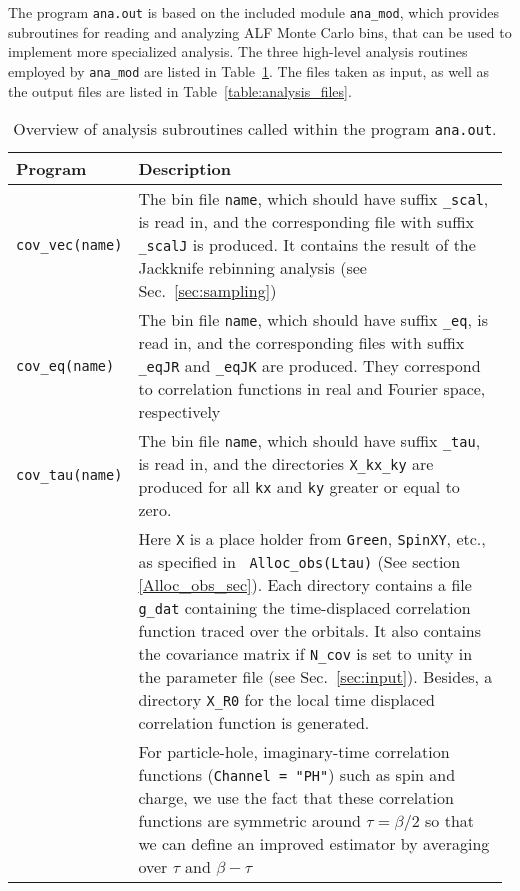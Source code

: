 The program \texttt{ana.out} is based on the included module \texttt{ana\_mod}, which provides subroutines for reading and analyzing ALF Monte Carlo bins, that can be used to implement more specialized analysis. The three high-level analysis routines employed by \texttt{ana\_mod} are listed in Table~\ref{table:analysis_programs}. The files taken as input, as well as the output files are listed in Table~\ref{table:analysis_files}.

\begin{table}[h]
	\begin{center}
	\begin{tabular}{@{} p{0.18\linewidth} @{$\;$} p{0.8\linewidth} @{}}\toprule
		Program & Description \\\midrule
		\texttt{cov\_vec(name)}  &  
		  The bin file \texttt{name}, which should have suffix \texttt{\_scal}, is read in, and  the corresponding file with suffix \texttt{\_scalJ} is produced. It contains the result of the Jackknife rebinning analysis (see Sec.~\ref{sec:sampling}) \\
		\texttt{cov\_eq(name)}    &  
		  The bin file \texttt{name}, which should have suffix \texttt{\_eq}, is read in, and the corresponding files with suffix \texttt{\_eqJR} and \texttt{\_eqJK} are produced. They  correspond to correlation functions in real and Fourier space, respectively \\
		\texttt{cov\_tau(name)}   &  
		  The bin file \texttt{name}, which should have suffix \texttt{\_tau}, is read in, and the directories \texttt{X\_kx\_ky} are produced for all \texttt{kx} and \texttt{ky} greater or equal to zero. \\
		& Here \texttt{X}  is a place holder from \texttt{Green}, \texttt{SpinXY}, etc., as specified in \texttt{ Alloc\_obs(Ltau)} (See section \ref{Alloc_obs_sec}). Each directory contains  a  file    \texttt{g\_dat}  containing the  time-displaced correlation function traced over the  orbitals.  It also contains the covariance matrix if \texttt{N\_cov} is set to unity in the parameter file (see Sec.~\ref{sec:input}). Besides, a directory \texttt{X\_R0} for the local time displaced correlation function is generated. \\
		& For particle-hole, imaginary-time correlation functions (\texttt{Channel = "PH"}) such as spin and charge, we use the fact that these correlation functions  are symmetric around $\tau = \beta/2$ so that we can define an improved estimator by averaging over $\tau$ and $\beta - \tau$
		\\\bottomrule
	\end{tabular}
	\caption{Overview of analysis subroutines called within the program \texttt{ana.out}. \label{table:analysis_programs}}
\end{center}
\end{table}
